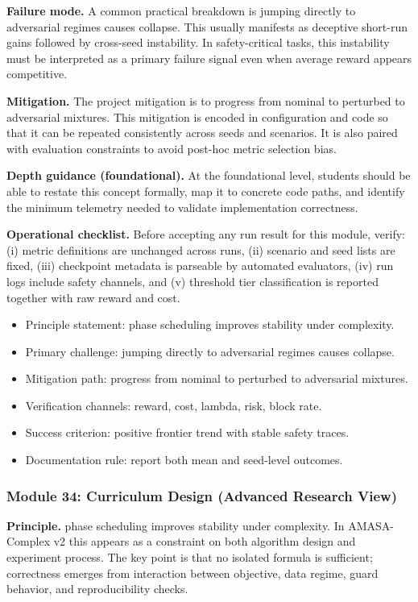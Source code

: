\documentclass[conference]{IEEEtran}
\begin{document}
\textbf{Failure mode.} A common practical breakdown is jumping directly to adversarial regimes causes collapse. This usually manifests as deceptive short-run gains followed by cross-seed instability. In safety-critical tasks, this instability must be interpreted as a primary failure signal even when average reward appears competitive.

\textbf{Mitigation.} The project mitigation is to progress from nominal to perturbed to adversarial mixtures. This mitigation is encoded in configuration and code so that it can be repeated consistently across seeds and scenarios. It is also paired with evaluation constraints to avoid post-hoc metric selection bias.

\textbf{Depth guidance (foundational).} At the foundational level, students should be able to restate this concept formally, map it to concrete code paths, and identify the minimum telemetry needed to validate implementation correctness.

\textbf{Operational checklist.} Before accepting any run result for this module, verify: (i) metric definitions are unchanged across runs, (ii) scenario and seed lists are fixed, (iii) checkpoint metadata is parseable by automated evaluators, (iv) run logs include safety channels, and (v) threshold tier classification is reported together with raw reward and cost.

\begin{itemize}[leftmargin=*]
  \item Principle statement: phase scheduling improves stability under complexity.
  \item Primary challenge: jumping directly to adversarial regimes causes collapse.
  \item Mitigation path: progress from nominal to perturbed to adversarial mixtures.
  \item Verification channels: reward, cost, lambda, risk, block rate.
  \item Success criterion: positive frontier trend with stable safety traces.
  \item Documentation rule: report both mean and seed-level outcomes.
\end{itemize}


\subsubsection{Module 34: Curriculum Design (Advanced Research View)}
\textbf{Principle.} phase scheduling improves stability under complexity. In AMASA-Complex v2 this appears as a constraint on both algorithm design and experiment process. The key point is that no isolated formula is sufficient; correctness emerges from interaction between objective, data regime, guard behavior, and reproducibility checks.
\end{document}

